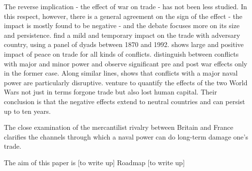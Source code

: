 \documentclass[12pt,a4paper,notitlepage,english]{article}
\begin{document}
The reverse implication - the effect of war on trade - has not been less studied.  
In this respect, however, there is a general agreement on the sign of the effect - the impact is mostly found to be negative - and the debate focuses more on its size and persistence.  
\cite{Levy2004} find a mild and temporary impact on the trade with adversary country, using a panel of dyads between 1870 and 1992.
\cite{blomberg2006much} shows large and positive impact of peace on trade for all kinds of conflicts. 
\cite{Anderton2001} distinguish between conflicts with major and minor power and observe significant pre and post war effects only in the former case. Along similar lines, \cite{Rahman2010} shows that conflicts with a major naval power are particularly disruptive. 
\cite{Glick2010} venture to quantify the effects of the two World Wars not just in terms forgone trade but also lost human capital. Their conclusion is that the negative effects extend to neutral countries and can persist up to ten years.  


The close examination of the mercantilist rivalry between Britain and France clarifies the channels through which a naval power can do long-term damage one's trade.

The aim of this paper is [to write up]
Roadmap [to write up]

\end{document}
